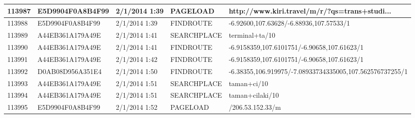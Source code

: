 \begin{longtable}{|p{1cm}|l|l|l|p{8cm}|}
113987         & E5D9904F0A8B4F99 & 2/1/2014 1:39            & PAGELOAD        & http://www.kiri.travel/m/r/?qs=trans+studi... \\ \hline
113988         & E5D9904F0A8B4F99 & 2/1/2014 1:39            & FINDROUTE       & -6.92600,107.63628/-6.88936,107.57533/1                                                                                                                                                                               \\ \hline
113989         & A44EB361A179A49E & 2/1/2014 1:41            & SEARCHPLACE     & terminal+ta/10                                                                                                                                                                                                        \\ \hline
113990         & A44EB361A179A49E & 2/1/2014 1:41            & FINDROUTE       & -6.9158359,107.6101751/-6.90658,107.61623/1                                                                                                                                                                           \\ \hline
113991         & A44EB361A179A49E & 2/1/2014 1:42            & FINDROUTE       & -6.9158359,107.6101751/-6.90658,107.61623/1                                                                                                                                                                           \\ \hline
113992         & D0AB08D956A351E4 & 2/1/2014 1:50            & FINDROUTE       & -6.38355,106.919975/-7.08933734335005,107.562576737255/1                                                                                                                                                              \\ \hline
113993         & A44EB361A179A49E & 2/1/2014 1:51            & SEARCHPLACE     & taman+ci/10                                                                                                                                                                                                           \\ \hline
113994         & A44EB361A179A49E & 2/1/2014 1:51            & SEARCHPLACE     & taman+cilaki/10                                                                                                                                                                                                       \\ \hline
113995         & E5D9904F0A8B4F99 & 2/1/2014 1:52            & PAGELOAD        & /206.53.152.33/m                                                                                                                                                                                                      \\ \hline

\end{longtable}
